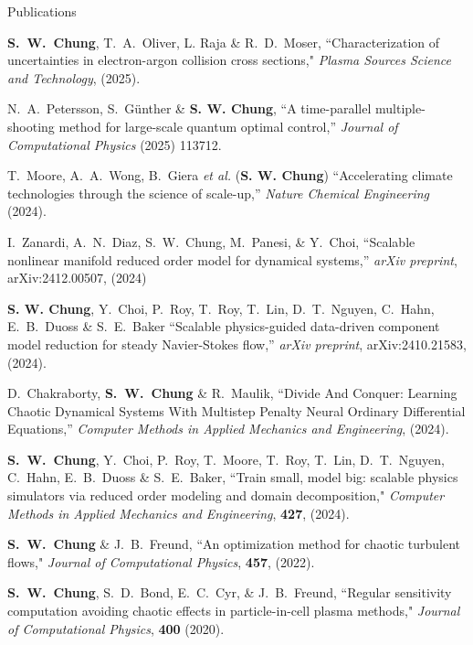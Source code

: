 \documentclass{resume} %
\begin{document}
\begin{rSection}{Publications}
\par
\textbf{S.\ W.\ Chung}, T.\ A.\ Oliver, L. Raja \& R.\ D.\ Moser,
``Characterization of uncertainties in electron-argon collision cross sections,"
\textit{Plasma Sources Science and Technology}, (2025).
\par
N.\ A.\ Petersson, S.\ G{\"u}nther \& \textbf{S. W. Chung},
``A time-parallel multiple-shooting method for large-scale quantum optimal control,''
\textit{Journal of Computational Physics} (2025) 113712.
\par
T.\ Moore, A.\ A.\ Wong, B.\ Giera \textit{et al.} (\textbf{S. W. Chung})
``Accelerating climate technologies through the science of scale-up,''
\textit{Nature Chemical Engineering} (2024).
\par
I.\ Zanardi, A.\ N.\ Diaz, S.\ W.\ Chung, M.\ Panesi, \& Y.\ Choi,
``Scalable nonlinear manifold reduced order model for dynamical systems,''
\textit{arXiv preprint}, arXiv:2412.00507, (2024)
\par
\textbf{S. W. Chung}, Y.\ Choi, P.\ Roy, T.\ Roy, T.\ Lin, D.\ T.\ Nguyen, C.\ Hahn, E.\ B.\ Duoss \& S.\ E.\ Baker
``Scalable physics-guided data-driven component model reduction for steady Navier-Stokes flow,''
\textit{arXiv preprint}, arXiv:2410.21583, (2024).
\par
D.\ Chakraborty, \textbf{S.\ W.\ Chung} \& R.\ Maulik,
``Divide And Conquer: Learning Chaotic Dynamical Systems With Multistep Penalty Neural Ordinary Differential Equations,''
\textit{Computer Methods in Applied Mechanics and Engineering}, (2024).
\par
\textbf{S.\ W.\ Chung}, Y.\ Choi, P.\ Roy, T.\ Moore, T.\ Roy, T.\ Lin, D.\ T.\ Nguyen, C.\ Hahn, E.\ B.\ Duoss \& S.\ E.\ Baker,
``Train small, model big: scalable physics simulators via reduced order modeling and domain decomposition,"
\textit{Computer Methods in Applied Mechanics and Engineering}, \textbf{427}, (2024).
\par
\par
\textbf{S.\ W.\ Chung} \& J.\ B.\ Freund,
``An optimization method for chaotic turbulent flows,"
\textit{Journal of Computational Physics}, \textbf{457}, (2022).
\par
\textbf{S.\ W.\ Chung}, S.\ D.\ Bond, E.\ C.\ Cyr, \& J.\ B.\ Freund,
``Regular sensitivity computation avoiding chaotic effects in particle-in-cell plasma methods,"
\textit{Journal of Computational Physics}, \textbf{400} (2020).
\end{rSection}
\end{document}
